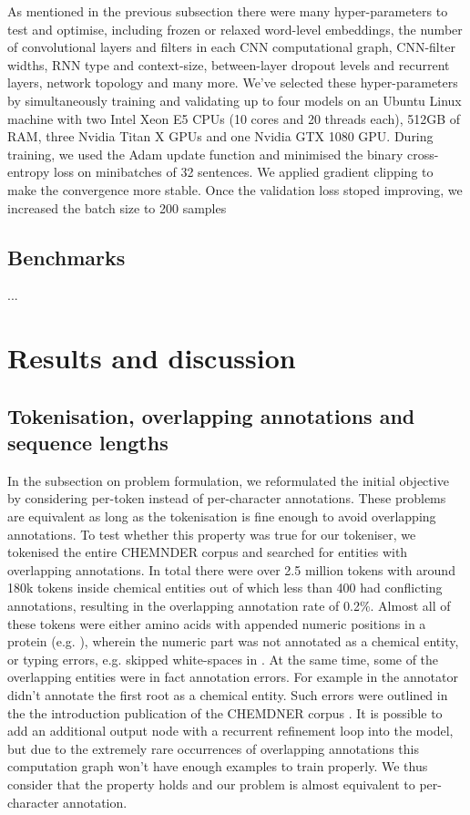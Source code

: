 \documentclass[twocolumn]{bmcart}%
\begin{document}
As mentioned in the previous subsection there were many hyper-parameters to test and optimise, including frozen or relaxed word-level embeddings, the number of convolutional layers and filters in each CNN computational graph, CNN-filter widths, RNN type and context-size, between-layer dropout levels and recurrent layers, network topology and many more.
We've selected these hyper-parameters by simultaneously training and validating up to four models on an Ubuntu Linux machine with two Intel Xeon E5 CPUs (10 cores and 20 threads each), 512GB of RAM, three Nvidia Titan X GPUs and one Nvidia GTX 1080 GPU.
During training, we used the Adam update function \cite{Kingma2014} and minimised the binary cross-entropy loss on minibatches of 32 sentences.
We applied gradient clipping to make the convergence more stable.
Once the validation loss stoped improving, we increased the batch size to 200 samples 

\subsection*{Benchmarks}

...

\section*{Results and discussion}

\subsection*{Tokenisation, overlapping annotations and sequence lengths}

In the subsection on problem formulation, we reformulated the initial objective by considering per-token instead of per-character annotations.
These problems are equivalent as long as the tokenisation is fine enough to avoid overlapping annotations.
To test whether this property was true for our tokeniser, we tokenised the entire CHEMNDER corpus and searched for entities with overlapping annotations.
In total there were over 2.5 million tokens with around 180k tokens inside chemical entities out of which less than 400 had conflicting annotations, resulting in the overlapping annotation rate of 0.2\%.
Almost all of these tokens were either amino acids with appended numeric positions in a protein (e.g. ), wherein the numeric part was not annotated as a chemical entity, or typing errors, e.g. skipped white-spaces in .
At the same time, some of the overlapping entities were in fact annotation errors.
For example in  the annotator didn't annotate the first root as a chemical entity.
Such errors were outlined in the the introduction publication of the CHEMDNER corpus \cite{Krallinger2015}.
It is possible to add an additional output node with a recurrent refinement loop into the model, but due to the extremely rare occurrences of overlapping annotations this computation graph won't have enough examples to train properly.
We thus consider that the property holds and our problem is almost equivalent to per-character annotation.
\end{document}
